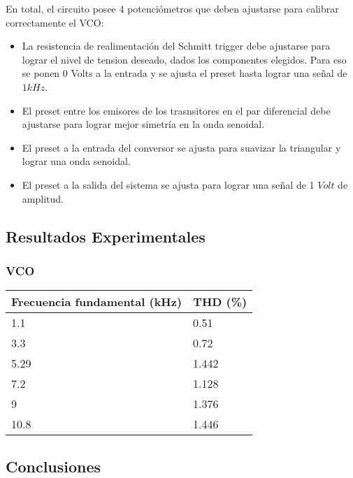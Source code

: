 En total, el circuito posee 4 potenciómetros que deben ajustarse para calibrar correctamente el VCO:


\begin{itemize}
\item La resistencia de realimentación del Schmitt trigger debe ajustarse para lograr el nivel de tension deseado, dados los componentes elegidos. Para eso se ponen 0 Volts a la entrada y se ajusta el preset hasta lograr una señal de $1kHz$.
\item El preset entre los emisores de los trasnsitores en el par diferencial debe ajustarse para lograr mejor simetría en la onda senoidal.
\item El preset a la entrada del conversor se ajusta para suavizar la triangular y lograr una onda senoidal.
\item El preset a la salida del sistema se ajusta para lograr una señal de 1 $Volt$ de amplitud. 
\end{itemize}


\subsection{Resultados Experimentales}
\subsubsection{}


\subsubsection{VCO}

\begin{table}[H]
\centering
\begin{tabular}{ll}\hline
\multicolumn{1}{c}{Frecuencia fundamental (kHz)} & THD (\%) \\ \hline
1.1                                              & 0.51     \\
3.3                                              & 0.72     \\
5.29                                             & 1.442    \\
7.2                                              & 1.128    \\
9                                                & 1.376    \\
10.8                                             & 1.446   \\ \hline
\end{tabular}
\end{table}

\subsection{Conclusiones}









